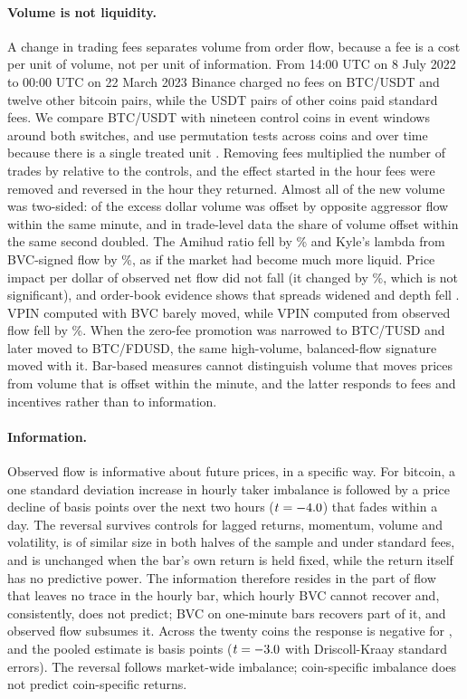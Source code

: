 \documentclass[11pt]{article}
\begin{document}
\paragraph{Volume is not liquidity.} A change in trading fees separates volume from order flow,
because a fee is a cost per unit of volume, not per unit of information. From 14:00 UTC on 8 July
2022 to 00:00 UTC on 22 March 2023 Binance charged no fees on BTC/USDT and twelve other bitcoin pairs,
while the USDT pairs of other coins paid standard fees. We compare BTC/USDT with nineteen control
coins in event windows around both switches, and use permutation tests across coins and over time
because there is a single treated unit \citep{conley2011,abadie2010}. Removing fees multiplied the
number of trades by \feeOnTradesX{} relative to the controls, and the effect started in the hour fees
were removed and reversed in the hour they returned. Almost all of the new volume was two-sided:
\feeExcessTwoShare{} of the excess dollar volume was offset by opposite aggressor flow within the same
minute, and in trade-level data the share of volume offset within the same second doubled. The
Amihud ratio fell by \feeOnAmihudPctA\% and Kyle's lambda from BVC-signed flow by
\feeOnLamBvcPctA\%, as if the market had become much more liquid. Price impact per dollar of observed
net flow did not fall (it changed by \feeOnLamTruePct\%, which is not significant), and order-book
evidence shows that spreads widened and depth fell \citep{galati2024}. VPIN computed with BVC barely
moved, while VPIN computed from observed flow fell by \feeOnVpinTruePctA\%. When the zero-fee
promotion was narrowed to BTC/TUSD and later moved to BTC/FDUSD, the same high-volume,
balanced-flow signature moved with it. Bar-based measures cannot distinguish volume that moves prices
from volume that is offset within the minute, and the latter responds to fees and incentives rather
than to information.

\paragraph{Information.} Observed flow is informative about future prices, in a specific way. For
bitcoin, a one standard deviation increase in hourly taker imbalance is followed by a price decline of
\BTCfrTakAtwo{} basis points over the next two hours ($t=-4.0$) that fades within a day. The
reversal survives controls for lagged returns, momentum, volume and volatility, is of similar size
in both halves of the sample and under standard fees, and is unchanged when the bar's own return is
held fixed, while the return itself has no predictive power. The information therefore resides in
the part of flow that leaves no trace in the hourly bar, which hourly BVC cannot recover and,
consistently, does not predict; BVC on one-minute bars recovers part of it, and observed flow
subsumes it. Across the twenty coins the response is negative for \panelNnegtwo{}, and the pooled
estimate is \poolAllBtwo{} basis points ($t=-3.0$ with Driscoll-Kraay standard errors). The
reversal follows market-wide imbalance; coin-specific imbalance does not predict coin-specific
returns.
\end{document}
